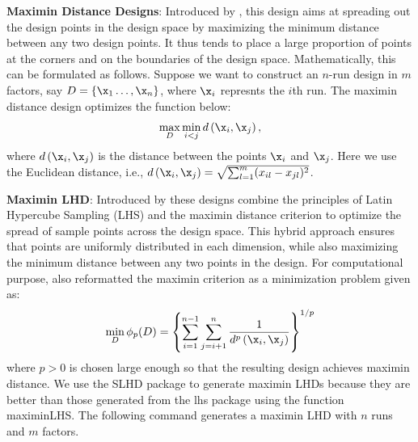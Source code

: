 \documentclass [PhD] {package/uclathes}
\begin{document}
\textbf{Maximin Distance Designs}:
 Introduced by \textcite{johnson1990minimax}, this design aims at spreading out the design points in the design space by maximizing the minimum distance between any two design points. It thus tends to place a large proportion of points at the corners and on the boundaries of the design space. Mathematically, this can be formulated as follows. Suppose we want to construct an $n$-run design in $m$ factors, say $D=\left\{\x_1 \ldots, \x_n\right\}$, where $\x_i$ represnts the $i$th run. The maximin distance design optimizes the function below:
\begin{equation}\label{eqn:maximin}
\max _D \min _{i < j} d\left(\x_i, \x_j\right),
\end{equation}
where $d\left(\x_i, \x_j\right)$ is the distance between the points $\x_i$ and $\x_j$. Here we use the Euclidean distance, i.e., $d\left(\x_i, \x_j\right) = \sqrt{\sum_{l=1}^m(x_{il} - x_{jl})^2}$.


\textbf{Maximin LHD}: Introduced by \textcite{morris1995exploratory} these designs combine the principles of Latin Hypercube Sampling (LHS) and the maximin distance criterion to optimize the spread of sample points across the design space. This hybrid approach ensures that points are uniformly distributed in each dimension, while also maximizing the minimum distance between any two points in the design. For computational purpose, \textcite{morris1995exploratory} also reformatted the maximin criterion as a minimization problem  given as:
\begin{equation}\label{eqn:maximinLHD}
\min _{D} \phi_p(D) = \left\{\sum_{i=1}^{n-1} \sum_{j=i+1}^n \frac{1}{d^p\left(\x_i, \x_j\right)}\right\}^{1 / p}
\end{equation}
where $p> 0$ is chosen large enough so that the resulting design achieves maximin distance. We use the SLHD package to generate maximin LHDs because they are better than those  generated from the lhs package using the function maximinLHS. The following command generates a maximin LHD with $n$ runs and $m$ factors.
\begin{Schunk}
\end{Schunk}
\end{document}
